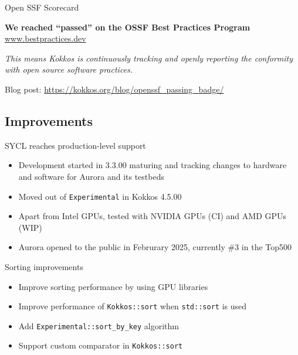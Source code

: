 \begin{frame}[fragile]{Open SSF Scorecard}
\begin{center}
\textbf{We reached ``passed'' on the OSSF Best Practices Program}
\href{https://www.bestpractices.dev/en/projects/9344}{www.bestpractices.dev}

\vspace{0.5cm}
\textit{This means Kokkos is continuously tracking and openly reporting the conformity with open source software practices.}

Blog post: \url{https://kokkos.org/blog/openssf_passing_badge/}
\end{center}
\end{frame}


\subsection{Improvements}

\begin{frame}[fragile]{SYCL reaches production-level support}
  \begin{itemize}
    \item Development started in 3.3.00 maturing and tracking changes to hardware and software for Aurora and its testbeds
    \item Moved out of \texttt{Experimental} in Kokkos 4.5.00
    \item Apart from Intel GPUs, tested with NVIDIA GPUs (CI) and AMD GPUs (WIP)
    \item Aurora opened to the public in Februrary 2025, currently \#3 in the Top500
  \end{itemize}
\end{frame}

\begin{frame}[fragile]{Sorting improvements}
  \begin{itemize}
\item Improve sorting performance by using GPU libraries
\item Improve performance of \texttt{Kokkos::sort} when \texttt{std::sort} is used
\item Add \texttt{Experimental::sort\_by\_key} algorithm
\item Support custom comparator in \texttt{Kokkos::sort}
  \end{itemize}
\end{frame}


